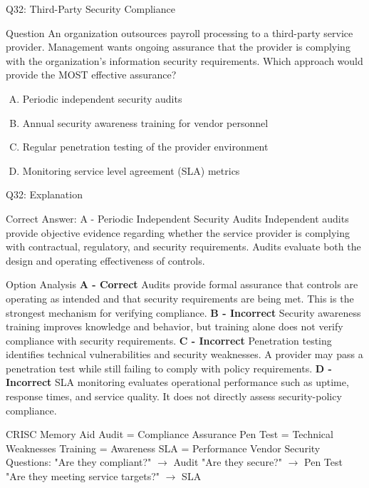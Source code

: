 \documentclass{beamer}
\begin{document}
	\begin{frame}{Q32: Third-Party Security Compliance} \begin{block}{Question} An organization outsources payroll processing to a third-party service provider. Management wants ongoing assurance that the provider is complying with the organization's information security requirements. Which approach would provide the MOST effective assurance? \end{block} \begin{enumerate}[(A)] \item Periodic independent security audits \item Annual security awareness training for vendor personnel \item Regular penetration testing of the provider environment \item Monitoring service level agreement (SLA) metrics \end{enumerate} \end{frame} \begin{frame}[shrink=10]{Q32: Explanation} \footnotesize \begin{block}{Correct Answer: A - Periodic Independent Security Audits} Independent audits provide objective evidence regarding whether the service provider is complying with contractual, regulatory, and security requirements. Audits evaluate both the design and operating effectiveness of controls. \end{block} \begin{block}{Option Analysis} \textbf{A - Correct} Audits provide formal assurance that controls are operating as intended and that security requirements are being met. This is the strongest mechanism for verifying compliance. \vspace{0.15cm} \textbf{B - Incorrect} Security awareness training improves knowledge and behavior, but training alone does not verify compliance with security requirements. \vspace{0.15cm} \textbf{C - Incorrect} Penetration testing identifies technical vulnerabilities and security weaknesses. A provider may pass a penetration test while still failing to comply with policy requirements. \vspace{0.15cm} \textbf{D - Incorrect} SLA monitoring evaluates operational performance such as uptime, response times, and service quality. It does not directly assess security-policy compliance. \end{block} \begin{block}{CRISC Memory Aid} Audit = Compliance Assurance \vspace{0.1cm} Pen Test = Technical Weaknesses \vspace{0.1cm} Training = Awareness \vspace{0.1cm} SLA = Performance \vspace{0.15cm} Vendor Security Questions: "Are they compliant?" $\rightarrow$ Audit "Are they secure?" $\rightarrow$ Pen Test "Are they meeting service targets?" $\rightarrow$ SLA \end{block} \end{frame}
	
\end{document}
